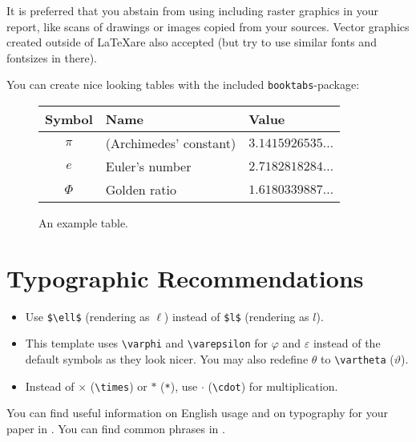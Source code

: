 \documentclass[a4paper,11pt,DIV=15]{scrartcl} %
\renewcommand{\phi}{\varphi}
\renewcommand{\epsilon}{\varepsilon}
\theoremstyle{plain}
\theoremstyle{definition}
\begin{document}
It is preferred that you abstain from using including raster graphics in your
report, like scans of drawings or images copied from your sources. 
Vector graphics created outside of \LaTeX are also accepted (but try to use 
similar fonts and fontsizes in there). 

You can create nice looking tables with the included \verb|booktabs|-package:

\begin{figure}[H]
	\centering
	\begin{tabular}{ c l l }
		\toprule
		\textbf{Symbol}	& \textbf{Name}				& \textbf{Value}\\
		\midrule
		$\pi$ 				& (Archimedes' constant)	& $3.1415926535\dots$\\
		$e$					& Euler's number				& $2.7182818284\dots$\\
		$\Phi$				& Golden ratio					& $1.6180339887\dots$\\
		\bottomrule
	\end{tabular}
	\caption{An example table.}
\end{figure}





\section{Typographic Recommendations}
\begin{itemize}
	\item Use \verb|$\ell$| (rendering as $\ell$) instead of \verb|$l$| 
		(rendering as $l$).
	\item This template uses \verb|\varphi| and \verb|\varepsilon| for $\phi$
		and $\epsilon$ instead of the default symbols as they look nicer.
		You may also redefine $\theta$ to \verb|\vartheta| ($\vartheta$).
	\item Instead of $\times$ (\verb|\times|) or $*$ (\verb|*|), use $\cdot$
		(\verb|\cdot|) for multiplication.
\end{itemize}
You can find useful information on English usage and on typography for your 
paper in \cite{Higham1998}. You can find common phrases in \cite{Trzeciak2005}.





\end{document}
